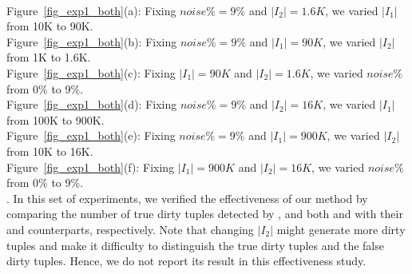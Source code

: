 \begin{figure*}
  \centering
  \quad
  \quad
  \quad \\
  \quad
  \quad

  \caption{Efficiency of detecting \pCFD and \pCIND violations}\label{fig_exp1_both}
\end{figure*}


\noindent Figure~\ref{fig_exp1_both}(a): Fixing $noise\% = 9\%$ and $|I_2| = 1.6K$, we varied $|I_1|$ from 10K to 90K.\\
Figure~\ref{fig_exp1_both}(b): Fixing $noise\% = 9\%$ and $|I_1| = 90K$, we varied $|I_2|$ from 1K to 1.6K.\\
Figure~\ref{fig_exp1_both}(c): Fixing $|I_1| = 90K$ and $|I_2| = 1.6K$, we varied $noise\%$ from 0\% to 9\%.\\
Figure~\ref{fig_exp1_both}(d): Fixing $noise\% = 9\%$ and $|I_2| = 16K$, we varied $|I_1|$ from 100K to 900K.\\
Figure~\ref{fig_exp1_both}(e): Fixing $noise\% = 9\%$ and $|I_1| = 900K$, we varied $|I_2|$ from 10K to 16K.\\
Figure~\ref{fig_exp1_both}(f): Fixing $|I_1| = 900K$ and $|I_2| = 16K$, we varied $noise\%$ from 0\% to 9\%.\\




. In this set of experiments, we verified the effectiveness of our method by comparing the number of true dirty tuples detected by \pCFDs, \pCINDs and both \pCFDs and \pCINDs with their \CFDs and \CINDs counterparts, respectively. Note that changing $|I_{2}|$ might generate more dirty tuples and make it difficulty to distinguish the true dirty tuples and the false dirty tuples. Hence, we do not report its result in this effectiveness study.

\begin{figure*}
  \centering
  \centering
  \quad
  \quad
  \quad
  \caption{Effectiveness of detecting \pCFD violations}\label{fig_exp2_cfdp}
\end{figure*}

